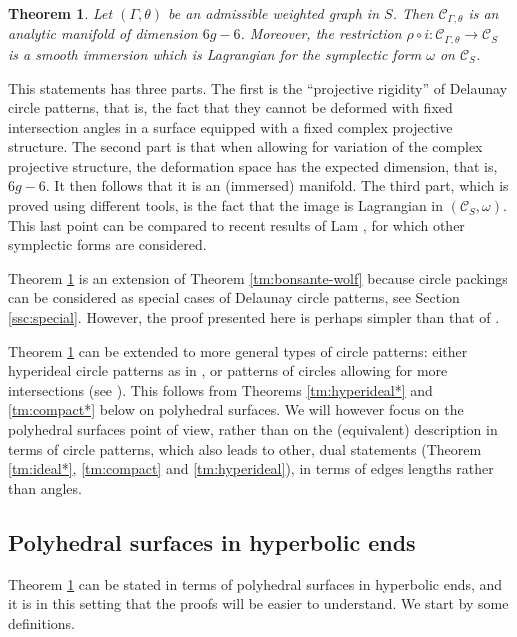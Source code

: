 \documentclass[notitlepage,twoside,a4paper]{amsart}
\newtheorem{theorem}{\rm\bf Theorem}[section]
\theoremstyle{named}
\newcommand{\cC}{{\mathcal C}}
\begin{document}
\begin{theorem} \label{tm:prorig-delaunay}
  Let $(\Gamma,\theta)$ be an admissible weighted graph in $S$. Then $\cC_{\Gamma,\theta}$ is an analytic manifold of dimension $6g-6$. Moreover, the restriction $\rho\circ i:\cC_{\Gamma,\theta}\to \cC_S$ is a smooth immersion which is Lagrangian for the symplectic form $\omega$ on $\cC_S$.
\end{theorem}

This statements has three parts. The first is the ``projective rigidity'' of Delaunay circle patterns, that is, the fact that they cannot be deformed with fixed intersection angles in a surface equipped with a fixed complex projective structure. The second part is that when allowing for variation of the complex projective structure, the deformation space has the expected dimension, that is, $6g-6$. It then follows that it is an (immersed) manifold. The third part, which is proved using different tools, is the fact that the image is Lagrangian in $(\cC_S,\omega)$. This last point can be compared to recent results of Lam \cite{lam:pullback}, for which other symplectic forms are considered.

Theorem \ref{tm:prorig-delaunay} is an extension of Theorem \ref{tm:bonsante-wolf} because circle packings can be considered as special cases of Delaunay circle patterns, see Section \ref{ssc:special}. However, the proof presented here is perhaps simpler than that of \cite{bonsante-wolf:projective}.

Theorem \ref{tm:prorig-delaunay} can be extended to more general types of circle patterns: either hyperideal circle patterns as in \cite{hcp,springborn-hcp,bobenko-lutz}, or patterns of circles allowing for more intersections (see \cite{bowers:combinatorics}). This follows from Theorems \ref{tm:hyperideal*} and \ref{tm:compact*} below on polyhedral surfaces. We will however focus on the polyhedral surfaces point of view, rather than on the (equivalent) description in terms of circle patterns, which also leads to other, dual statements (Theorem \ref{tm:ideal*}, \ref{tm:compact} and \ref{tm:hyperideal}), in terms of edges lengths rather than angles.

\subsection{Polyhedral surfaces in hyperbolic ends}

Theorem \ref{tm:prorig-delaunay} can be stated in terms of polyhedral surfaces in hyperbolic ends, and it is in this setting that the proofs will be easier to understand. We start by some definitions.
\end{document}
